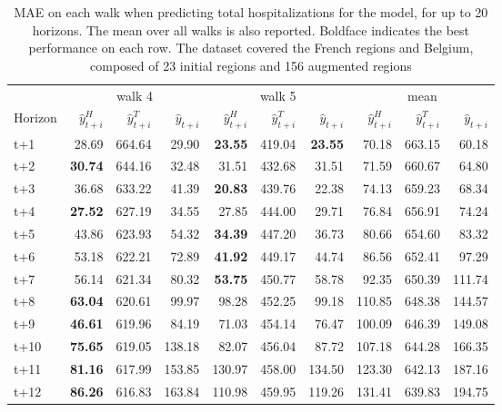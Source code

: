 \begin{table}[H]
\centering
\caption{MAE on each walk when predicting total hospitalizations for the model, for up to 20 horizons. The mean over all walks is also reported. Boldface indicates the best performance on each row. The dataset covered the French regions and Belgium, composed of 23 initial regions and 156 augmented regions }
\label{tab:MAE_walk_assemble}
\begin{tabular}{lrrrrrrrrr}
\toprule
 & \multicolumn{3}{c}{walk 4} & \multicolumn{3}{c}{walk 5} & \multicolumn{3}{c}{mean} 
\\

\cmidrule(lr){2-4} \cmidrule(lr){5-7} \cmidrule(lr){8-10} 
Horizon & $\hat{y}_{t+i}^H$ & $\hat{y}_{t+i}^T$ & $\hat{y}_{t+i}$ & $\hat{y}_{t+i}^H$ & $\hat{y}_{t+i}^T$ & $\hat{y}_{t+i}$ & $\hat{y}_{t+i}^H$ & $\hat{y}_{t+i}^T$ & $\hat{y}_{t+i}$ \\
\midrule
t+1  & 28.69  & 664.64  & 29.90  & \textbf{23.55}  & 419.04  & \textbf{23.55}  & 70.18  & 663.15  & 60.18  \\
t+2  & \textbf{30.74}  & 644.16  & 32.48  & 31.51  & 432.68  & 31.51  & 71.59  & 660.67  & 64.80  \\
t+3  & 36.68  & 633.22  & 41.39  & \textbf{20.83}  & 439.76  & 22.38  & 74.13  & 659.23  & 68.34  \\
t+4  & \textbf{27.52}  & 627.19  & 34.55  & 27.85  & 444.00  & 29.71  & 76.84  & 656.91  & 74.24  \\
t+5  & 43.86  & 623.93  & 54.32  & \textbf{34.39}  & 447.20  & 36.73  & 80.66  & 654.60  & 83.32  \\
t+6  & 53.18  & 622.21  & 72.89  & \textbf{41.92}  & 449.17  & 44.74  & 86.56  & 652.41  & 97.29  \\
t+7  & 56.14  & 621.34  & 80.32  & \textbf{53.75}  & 450.77  & 58.78  & 92.35  & 650.39  & 111.74  \\
t+8  & \textbf{63.04}  & 620.61  & 99.97  & 98.28  & 452.25  & 99.18  & 110.85  & 648.38  & 144.57  \\
t+9  & \textbf{46.61}  & 619.96  & 84.19  & 71.03  & 454.14  & 76.47  & 100.09  & 646.39  & 149.08  \\
t+10  & \textbf{75.65}  & 619.05  & 138.18  & 82.07  & 456.04  & 87.72  & 107.18  & 644.28  & 166.35  \\
t+11  & \textbf{81.16}  & 617.99  & 153.85  & 130.97  & 458.00  & 134.50  & 123.30  & 642.13  & 187.16  \\
t+12  & \textbf{86.26}  & 616.83  & 163.84  & 110.98  & 459.95  & 119.26  & 131.41  & 639.83  & 194.75  \\

\end{tabular}
\end{table}
